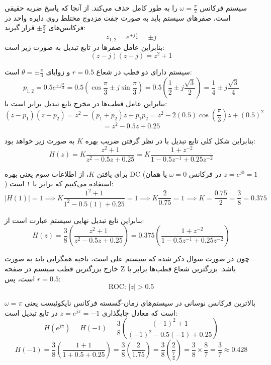 
سیستم فرکانس $\omega = \frac{\pi}{2}$ را به طور کامل حذف می‌کند. از آنجا که پاسخ ضربه حقیقی است، صفرهای سیستم باید به صورت جفت مزدوج مختلط روی دایره واحد در فرکانس‌های $\pm \frac{\pi}{2}$ قرار گیرند:
    \[
    z_{1,2} = e^{\pm j \frac{\pi}{2}} = \pm j
    \]
    بنابراین عامل صفرها در تابع تبدیل به صورت زیر است:
    \[
    (z - j)(z + j) = z^2 + 1
    \]

سیستم دارای دو قطب در شعاع $r = 0.5$ و زوایای $\theta = \pm \frac{\pi}{3}$ است:
    \[
    p_{1,2} = 0.5 e^{\pm j \frac{\pi}{3}} = 0.5 \left( \cos\frac{\pi}{3} \pm j \sin\frac{\pi}{3} \right) = 0.5 \left( \frac{1}{2} \pm j \frac{\sqrt{3}}{2} \right) = \frac{1}{4} \pm j \frac{\sqrt{3}}{4}
    \]
    بنابراین عامل قطب‌ها در مخرج تابع تبدیل برابر است با:
    \[
    (z - p_1)(z - p_2) = z^2 - (p_1 + p_2)z + p_1 p_2 = z^2 - 2(0.5)\cos\left(\frac{\pi}{3}\right)z + (0.5)^2
    \]
    \[
    = z^2 - 0.5z + 0.25
    \]

بنابراین شکل کلی تابع تبدیل با در نظر گرفتن ضریب بهره $K$ به صورت زیر خواهد بود:
\[
H(z) = K \frac{z^2 + 1}{z^2 - 0.5z + 0.25} = K \frac{1 + z^{-2}}{1 - 0.5z^{-1} + 0.25z^{-2}}
\]

برای یافتن $K$، از اطلاعات سوم یعنی بهره DC (در فرکانس $\omega = 0$ یا همان $z = e^{j0} = 1$) استفاده می‌کنیم که برابر با ۱ است:
\[
|H(1)| = 1 \implies K \frac{1^2 + 1}{1^2 - 0.5(1) + 0.25} = 1 \implies K \frac{2}{0.75} = 1 \implies K = \frac{0.75}{2} = \frac{3}{8} = 0.375
\]

بنابراین تابع تبدیل نهایی سیستم عبارت است از:
\[
H(z) = \frac{3}{8} \left( \frac{z^2 + 1}{z^2 - 0.5z + 0.25} \right) = 0.375 \left( \frac{1 + z^{-2}}{1 - 0.5z^{-1} + 0.25z^{-2}} \right)
\]

چون در صورت سوال ذکر شده که سیستم {علی} است، ناحیه همگرایی باید به صورت خارج بزرگترین قطب سیستم در صفحه Z باشد. بزرگترین شعاع قطب‌ها برابر با $r = 0.5$ است، پس:
\[
\text{ROC: } |z| > 0.5
\]

بالاترین فرکانس نوسانی در سیستم‌های زمان-گسسته فرکانس نایکوئیست یعنی $\omega = \pi$ است که معادل جایگذاری $z = e^{j\pi} = -1$ در تابع تبدیل است:
\[
H(e^{j\pi}) = H(-1) = \frac{3}{8} \left( \frac{(-1)^2 + 1}{(-1)^2 - 0.5(-1) + 0.25} \right)
\]
\[
H(-1) = \frac{3}{8} \left( \frac{1 + 1}{1 + 0.5 + 0.25} \right) = \frac{3}{8} \left( \frac{2}{1.75} \right) = \frac{3}{8} \left( \frac{2}{\frac{7}{4}} \right) = \frac{3}{8} \times \frac{8}{7} = \frac{3}{7} \approx 0.428
\]



